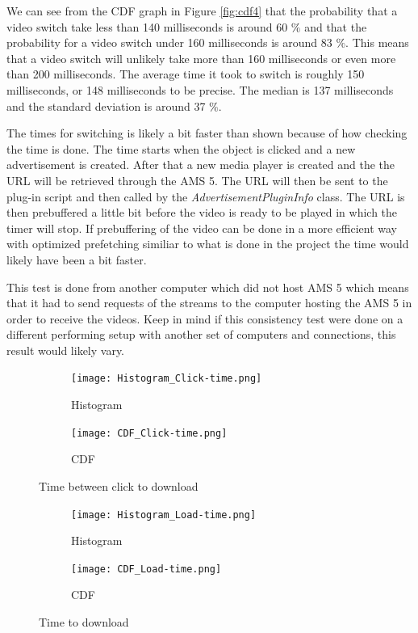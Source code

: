 We can see from the CDF graph in Figure \ref{fig:cdf4} that the probability that a video switch take less than 140 milliseconds is around 60 $\%$ and that the probability for a video switch under 160 milliseconds is around 83 $\%$. This means that a video switch will unlikely take more than 160 milliseconds or even more than 200 milliseconds. The average time it took to switch is roughly 150 milliseconds, or 148 milliseconds to be precise. The median is 137 milliseconds and the standard deviation is around 37 $\%$.

The times for switching is likely a bit faster than shown because of how checking the time is done. The time starts when the object is clicked and a new advertisement is created. After that a new media player is created and the the URL will be retrieved through the AMS 5. The URL will then be sent to the plug-in script and then called by the \textit{AdvertisementPluginInfo} class. The URL is then prebuffered a little bit before the video is ready to be played in which the timer will stop. If prebuffering of the video can be done in a more efficient way with optimized prefetching similiar to what is done in the project \cite{optimizedstreaming} the time would likely have been a bit faster.

This test is done from another computer which did not host AMS 5 which means that it had to send requests of the streams to the computer hosting the AMS 5 in order to receive the videos. Keep in mind if this consistency test were done on a different performing setup with another set of computers and connections, this result would likely vary.

\begin{figure}[!ht]
\begin{subfigure}[b]{0.5\textwidth}
 	\texttt{[image: Histogram\_Click-time.png]}
  	\caption{Histogram}\label{fig:histogram}
    \end{subfigure}\hfill 
    \hspace{3px}
    \begin{subfigure}[b]{0.5\textwidth}
	 \texttt{[image: CDF\_Click-time.png]}
 	\caption{CDF}\label{fig:cdf}
    \end{subfigure}
	\caption{Time between click to download}
	\label{fig:click-time}
\end{figure}

\begin{figure}
\begin{subfigure}[b]{0.5\textwidth}
 	\texttt{[image: Histogram\_Load-time.png]}
  	\caption{Histogram}\label{fig:histogram2}
    \end{subfigure}\hfill 
    \hspace{3px}
    \begin{subfigure}[b]{0.5\textwidth}
	 \texttt{[image: CDF\_Load-time.png]}
 	\caption{CDF}\label{fig:cdf2}
    \end{subfigure}
	\caption{Time to download}
	\label{fig:load-time}
\end{figure}


